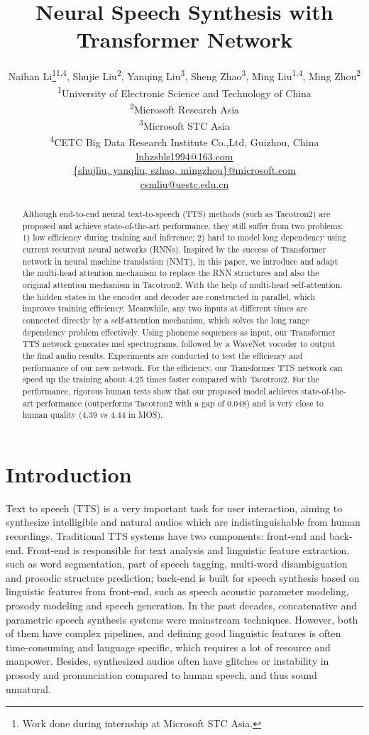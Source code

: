 \documentclass[letterpaper]{article} \usepackage{aaai19}  \usepackage{times}  \usepackage{helvet}  \usepackage{courier}  \usepackage{url}  \usepackage{graphicx}  \frenchspacing
\title{Neural Speech Synthesis with Transformer Network}
\author{
Naihan Li\thanks{Work done during internship at Microsoft STC Asia.}\textsuperscript{1,4},
Shujie Liu\textsuperscript{2}, Yanqing Liu\textsuperscript{3}, Sheng Zhao\textsuperscript{3},
Ming Liu\textsuperscript{1,4}, Ming Zhou\textsuperscript{2}\\
\textsuperscript{1}{University of Electronic Science and Technology of China}\\
\textsuperscript{2}{Microsoft Research Asia}\\
\textsuperscript{3}{Microsoft STC Asia}\\
\textsuperscript{4}{CETC Big Data Research Institute Co.,Ltd, Guizhou, China}\\
\url{lnhzsbls1994@163.com}\\
\url{{shujliu, yanqliu, szhao, mingzhou}@microsoft.com}\\
\url{csmliu@uestc.edu.cn}\\
}
\begin{document}
\maketitle
\begin{abstract}
Although end-to-end neural text-to-speech (TTS) methods (such as Tacotron2) are proposed and achieve state-of-the-art performance, they still suffer from two problems: 1) low efficiency during training and inference; 2) hard to model long dependency using current recurrent neural networks (RNNs).
Inspired by the success of Transformer network in neural machine translation (NMT), in this paper, we introduce and adapt the multi-head attention mechanism to replace the RNN structures and also the original attention mechanism in Tacotron2. With the help of multi-head self-attention, the hidden states in the encoder and decoder are constructed in parallel, which improves training efficiency. Meanwhile, any two inputs at different times are connected directly by a self-attention mechanism, which solves the long range dependency problem effectively.
Using phoneme sequences as input, our Transformer TTS network generates mel spectrograms, followed by a WaveNet vocoder to output the final audio results. Experiments are conducted to test the efficiency and performance of our new network. For the efficiency, our Transformer TTS network can speed up the training about 4.25 times faster compared with Tacotron2. For the performance, rigorous human tests show that our proposed model achieves state-of-the-art performance (outperforms Tacotron2 with a gap of 0.048) and is very close to human quality (4.39 vs 4.44 in MOS).
\end{abstract}

\section{Introduction}

Text to speech (TTS) is a very important task for user interaction, aiming to synthesize intelligible and natural audios which are indistinguishable from human recordings. Traditional TTS systems have two components: front-end and back-end. Front-end is responsible for text analysis and linguistic feature extraction, such as word segmentation, part of speech tagging, multi-word disambiguation and prosodic structure prediction; back-end is built for speech synthesis based on linguistic features from front-end, such as speech acoustic parameter modeling, prosody modeling and speech generation. In the past decades, concatenative and parametric speech synthesis systems were mainstream techniques. However, both of them have complex pipelines, and defining good linguistic features is often time-consuming and language specific, which requires a lot of resource and manpower. Besides, synthesized audios often have glitches or instability in prosody and pronunciation compared to human speech, and thus sound unnatural.
\end{document}
